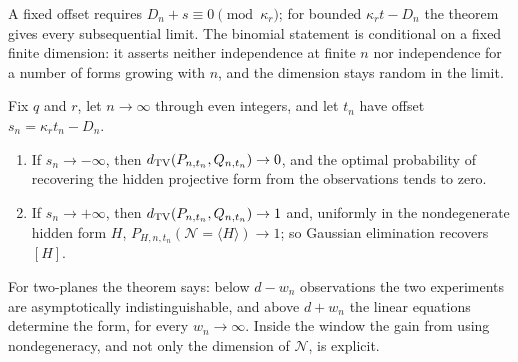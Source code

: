 A fixed offset requires $D_n+s\equiv0\pmod{\kappa_r}$; for bounded $\kappa_rt-D_n$ the theorem gives
every subsequential limit. The binomial statement is conditional on a fixed finite dimension: it
asserts neither independence at finite $n$ nor independence for a number of forms growing with $n$,
and the dimension stays random in the limit.

\begin{theorem}\label{spn:thm:hidden-threshold}
Fix $q$ and $r$, let $n\to\infty$ through even integers, and let $t_n$ have offset
$s_n=\kappa_rt_n-D_n$.
\begin{enumerate}
\item If $s_n\to-\infty$, then $d_{\mathrm{TV}}(P_{n,t_n},Q_{n,t_n})\to0$, and the optimal probability of
recovering the hidden projective form from the observations tends to zero.
\item If $s_n\to+\infty$, then $d_{\mathrm{TV}}(P_{n,t_n},Q_{n,t_n})\to1$ and, uniformly in the
nondegenerate hidden form $H$, $P_{H,n,t_n}(\mathcal N=\langle H\rangle)\to1$; so Gaussian
elimination recovers $[H]$.
\end{enumerate}
\end{theorem}

For two-planes the theorem says: below $d-w_n$ observations the two experiments are asymptotically indistinguishable, and above
$d+w_n$ the linear equations determine the form, for every $w_n\to\infty$. Inside the window the
gain from using nondegeneracy, and not only the dimension of $\mathcal N$, is explicit.

